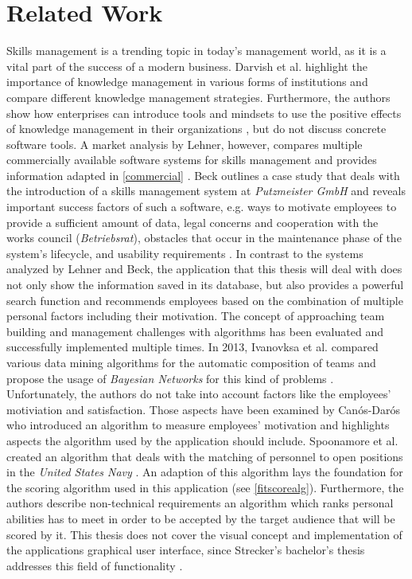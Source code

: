 \chapter{Related Work}

Skills management is a trending topic in today's management world, as it is a vital part of the success of a modern business.
Darvish et al. highlight the importance of knowledge management in various forms of institutions and compare different knowledge management strategies.
Furthermore, the authors show how enterprises can introduce tools and mindsets to use the positive effects of knowledge management in their organizations \cite{darvish}, but do not discuss concrete software tools.
A market analysis by Lehner, however, compares multiple commercially available software systems for skills management and provides information adapted in \ref{commercial}  \cite{Marktanalyse}.
\newline
Beck outlines a case study that deals with the introduction of a skills management system at \textit{Putzmeister GmbH} and reveals important success factors of such a software, e.g. ways to motivate employees to provide a sufficient amount of data, legal concerns and cooperation with the works council (\textit{Betriebsrat}), obstacles that occur in the maintenance phase of the system's lifecycle, and usability requirements \cite{beck}.
\newline
In contrast to the systems analyzed by Lehner and Beck, the application that this thesis will deal with does not only
show the information saved in its database, but also provides a powerful search function and recommends employees based on the combination of multiple personal factors including their motivation.
\newline
The concept of approaching team building and management challenges with algorithms has been evaluated and successfully implemented multiple times.
In 2013, Ivanovksa et al. compared various data mining algorithms for the automatic composition of teams and propose the usage of \textit{Bayesian Networks} for this kind of problems \cite{ivanovska}. Unfortunately, the authors do not take into account factors like the employees' motiviation and satisfaction. Those aspects have been examined by Canós-Darós who introduced an algorithm to measure employees' motivation \cite{CanosDaros2013} and highlights aspects the algorithm used by the application should include.
Spoonamore et al. created an algorithm that deals with the matching of personnel to open positions in the \textit{United States Navy} \cite{USN}. An adaption of this algorithm lays the foundation for the scoring algorithm used in this application (see \ref{fitscorealg}). Furthermore, the authors describe non-technical requirements an algorithm which ranks personal abilities has to
meet in order to be accepted by the target audience that will be scored by it.
\newline
This thesis does not cover the visual concept and implementation of the applications graphical user interface, since
Strecker's bachelor's thesis addresses this field of functionality \cite{strecker}.
